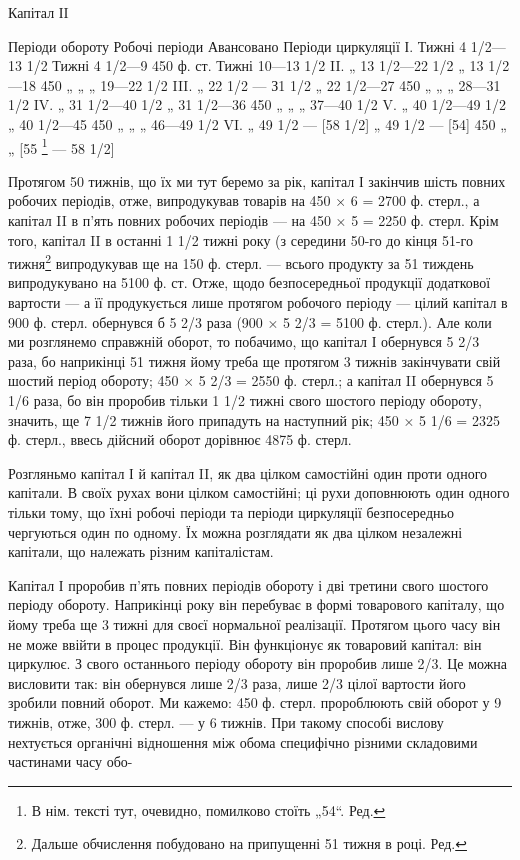 Капітал ІI

Періоди обороту    Робочі періоди    Авансовано    Періоди циркуляції
І. Тижні 4 1/2—13 1/2  Тижні 4 1/2—9    450 ф. ст. Тижні 10—13 1/2
II. „ 13 1/2—22 1/2 „ 13 1/2—18    450 „ „ „ 19—22 1/2
III. „ 22 1/2 — З1 1/2 „ 22 1/2—27    450 „ „ „ 28—31 1/2
IV. „ 31 1/2—40 1/2 „ 31  1/2—36    450 „ „ „ 37—40 1/2
V. „ 40 1/2—49 1/2 „ 40 1/2—45    450 „ „ „ 46—49 1/2
VI. „ 49 1/2 — [58 1/2]  „ 49 1/2 — [54] 450 „ „ [55 \footnote*{
В нім. тексті тут, очевидно, помилково стоїть „54“. Ред.
} — 58 1/2]

Протягом 50 тижнів, що їх ми тут беремо за рік, капітал І закінчив
шість повних робочих періодів, отже, випродукував товарів на 450 × 6
= 2700 ф. стерл., а капітал II в п’ять повних робочих періодів — на
450 × 5 = 2250 ф. стерл. Крім того, капітал II в останні 1 1/2 тижні року
(з середини 50-го до кінця 51-го тижня\footnote*{
Дальше обчислення побудовано на припущенні 51 тижня в році. Ред.
} випродукував ще на 150 ф.
стерл. — всього продукту за 51 тиждень випродукувано на 5100 ф. ст.
Отже, щодо безпосередньої продукції додаткової вартости — а її продукується
лише протягом робочого періоду — цілий капітал в 900 ф. стерл. обернувся
б 5 2/3 раза (900 × 5 2/3 = 5100 ф. стерл.). Але коли ми розглянемо
справжній оборот, то побачимо, що капітал І обернувся 5 2/3 раза, бо
наприкінці 51 тижня йому треба ще протягом 3 тижнів закінчувати
свій шостий період обороту; 450 × 5 2/3 = 2550 ф. стерл.; а капітал
II обернувся 5 1/6 раза, бо він проробив тільки 1 1/2 тижні свого
шостого періоду обороту, значить, ще 7 1/2 тижнів його припадуть на
наступний рік; 450 × 5 1/6 = 2325 ф. стерл., ввесь дійсний оборот дорівнює
4875 ф. стерл.

Розгляньмо капітал І й капітал II, як два цілком самостійні один проти
одного капітали. В своїх рухах вони цілком самостійні; ці рухи доповнюють
один одного тільки тому, що їхні робочі періоди та періоди
циркуляції безпосередньо чергуються один по одному. Їх можна розглядати
як два цілком незалежні капітали, що належать різним капіталістам.

Капітал І проробив п’ять повних періодів обороту і дві третини свого
шостого періоду обороту. Наприкінці року він перебуває в формі товарового
капіталу, що йому треба ще 3 тижні для своєї нормальної реалізації.
Протягом цього часу він не може ввійти в процес продукції.
Він функціонує як товаровий капітал: він циркулює. З свого останнього
періоду обороту він проробив лише 2/3. Це можна висловити так: він
обернувся лише 2/3 раза, лише 2/3 цілої вартости його зробили повний оборот.
Ми кажемо: 450 ф. стерл. пророблюють свій оборот у 9 тижнів, отже,
300 ф. стерл. — у 6 тижнів. При такому способі вислову нехтується органічні
відношення між обома специфічно різними складовими частинами часу обо-